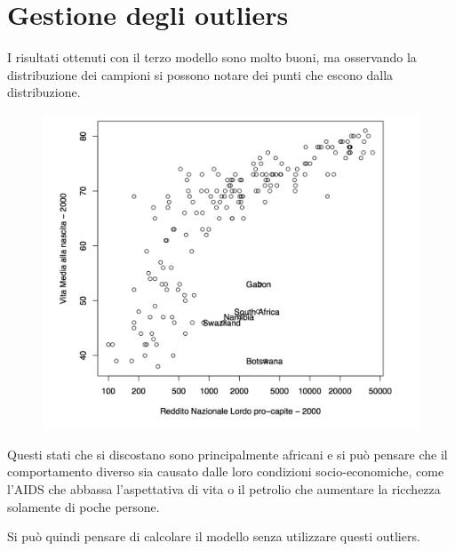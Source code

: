 \section{Gestione degli outliers}\label{gestione-degli-outliers}

I risultati ottenuti con il terzo modello sono molto buoni, ma osservando la distribuzione dei campioni si possono notare dei punti che escono dalla distribuzione.

\begin{figure}[htbp]
	\centering
	\includegraphics[width=.5\textwidth]{./notes/immagini/l8-fig1.png}
\end{figure}

Questi stati che si discostano sono principalmente africani e si può pensare che il comportamento diverso sia causato dalle loro condizioni socio-economiche, come l'AIDS che abbassa l'aspettativa di vita o il petrolio che aumentare la ricchezza solamente di poche persone.

Si può quindi pensare di calcolare il modello senza utilizzare questi outliers.

